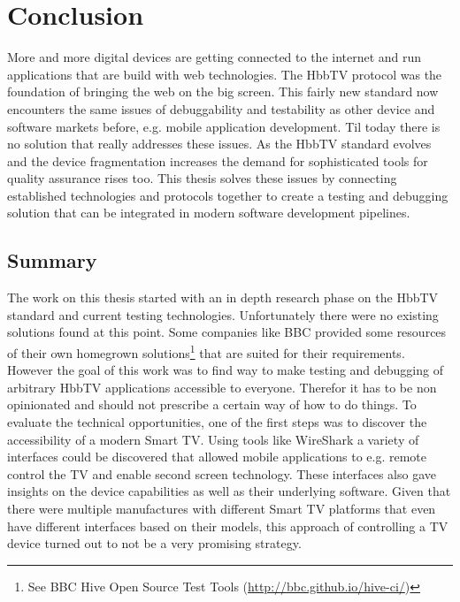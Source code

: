 \chapter{Conclusion\label{cha:chapter7}}

%

More and more digital devices are getting connected to the internet and run applications that are build with web
technologies. The HbbTV protocol was the foundation of bringing the web on the big screen. This fairly new standard
now encounters the same issues of debuggability and testability as other device and software markets before, e.g.
mobile application development. Til today there is no solution that really addresses these issues. As the HbbTV
standard evolves and the device fragmentation increases the demand for sophisticated tools for quality assurance
rises too. This thesis solves these issues by connecting established technologies and protocols together to create
a testing and debugging solution that can be integrated in modern software development pipelines.

\section{Summary\label{sec:summary}}


The work on this thesis started with an in depth research phase on the HbbTV standard and current testing technologies.
Unfortunately there were no existing solutions found at this point. Some companies like BBC provided some resources
of their own homegrown solutions\footnote{See BBC Hive Open Source Test Tools (\url{http://bbc.github.io/hive-ci/})}
that are suited for their requirements. However the goal of this work was to find way to make testing and debugging
of arbitrary HbbTV applications accessible to everyone. Therefor it has to be non opinionated and should not prescribe
a certain way of how to do things. To evaluate the technical opportunities, one of the first steps was to discover
the accessibility of a modern Smart TV. Using tools like WireShark a variety of interfaces could be discovered that
allowed mobile applications to e.g. remote control the TV and enable second screen technology. These interfaces also
gave insights on the device capabilities as well as their underlying software. Given that there were multiple
manufactures with different Smart TV platforms that even have different interfaces based on their models, this approach
of controlling a TV device turned out to not be a very promising strategy.

